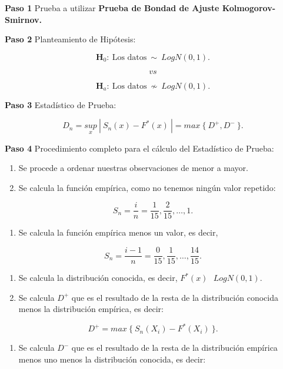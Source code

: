 \documentclass[
  a4paper,
  oneside,
  openany]{book}
\providecommand{\tightlist}{%
  \setlength{\itemsep}{0pt}\setlength{\parskip}{0pt}}
\begin{document}
\textbf{Paso 1} Prueba a utilizar \textbf{Prueba de Bondad de Ajuste Kolmogorov-Smirnov.}

\textbf{Paso 2} Planteamiento de Hipótesis:

\[\textbf{H}_0: \ \mbox{Los datos} \ \sim  \ LogN(0,1).\]

\[vs\]

\[\textbf{H}_a: \ \mbox{Los datos} \  \nsim \  LogN(0,1).\]

\textbf{Paso 3} Estadístico de Prueba:

\[D_{n}=\underset{x}{sup} \ | \ S_{n}(x)-F^*(x) \ |=max \ \{\ D^+,D^- \ \}.\]

\textbf{Paso 4} Procedimiento completo para el cálculo del Estadístico de Prueba:

\begin{enumerate}
\def\labelenumi{\arabic{enumi})}
\item
  Se procede a ordenar nuestras observaciones de menor a mayor.
\item
  Se calcula la función empírica, como no tenemos ningún valor repetido:
\end{enumerate}

\[S_{n}= \frac{i}{n}=\frac{1}{15},\frac{2}{15}, \ldots, 1.\]

\begin{enumerate}
\def\labelenumi{\arabic{enumi})}
\setcounter{enumi}{2}
\tightlist
\item
  Se calcula la función empírica menos un valor, es decir,
\end{enumerate}

\[S_{n}= \frac{i-1}{n}=\frac{0}{15},\frac{1}{15}, \ldots, \frac{14}{15}.\]

\begin{enumerate}
\def\labelenumi{\arabic{enumi})}
\setcounter{enumi}{3}
\item
  Se calcula la distribución conocida, es decir, \(F^*(x) \ \ \  LogN(0,1).\)
\item
  Se calcula \(D^+\) que es el resultado de la resta de la distribución conocida menos la distribución empírica, es decir:
\end{enumerate}

\[D^+= max \ \{\ S_{n}(X_{i})-F^*(X_{i}) \ \}.\]

\begin{enumerate}
\def\labelenumi{\arabic{enumi})}
\setcounter{enumi}{5}
\tightlist
\item
  Se calcula \(D^-\) que es el resultado de la resta de la distribución empírica menos uno menos la distribución conocida, es decir:
\end{enumerate}
\end{document}
